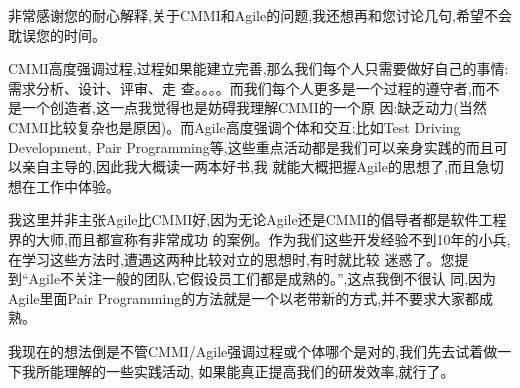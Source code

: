 \documentclass[11pt]{article}
\begin{document}
\begin{yang}

\ylogo 非常感谢您的耐心解释,关于CMMI和Agile的问题,我还想再和您讨论几句,希望不会耽误您的时间。

CMMI高度强调过程,过程如果能建立完善,那么我们每个人只需要做好自己的事情:需求分析、设计、评审、走
查。。。。而我们每个人更多是一个过程的遵守者,而不是一个创造者,这一点我觉得也是妨碍我理解CMMI的一个原
因:缺乏动力(当然CMMI比较复杂也是原因)。而Agile高度强调个体和交互;比如Test Driving Development,
Pair Programming等,这些重点活动都是我们可以亲身实践的而且可以亲自主导的,因此我大概读一两本好书,我
就能大概把握Agile的思想了,而且急切想在工作中体验。

我这里并非主张Agile比CMMI好,因为无论Agile还是CMMI的倡导者都是软件工程界的大师,而且都宣称有非常成功
的案例。作为我们这些开发经验不到10年的小兵,在学习这些方法时,遭遇这两种比较对立的思想时,有时就比较
迷惑了。您提到``Agile不关注一般的团队,它假设员工们都是成熟的。'',这点我倒不很认
同,因为Agile里面Pair Programming的方法就是一个以老带新的方式,并不要求大家都成熟。

我现在的想法倒是不管CMMI/Agile强调过程或个体哪个是对的,我们先去试着做一下我所能理解的一些实践活动,
如果能真正提高我们的研发效率,就行了。
\end{yang}
\end{document}
